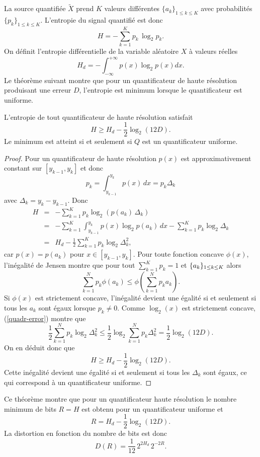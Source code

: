 La source quantifi\'ee $\tilde X$ prend $K$ valeurs diff\'erentes
$\{a_k\}_{1 \leq k \leq K}$ avec probabilit\'es
$\{p_k\}_{1 \leq k \leq K}$.
L'entropie du signal quantifi\'e est donc
\[
H = - \sum_{k=1}^K p_k\, \log_2 p_k .
\]
On d\'efinit l'entropie diff\'erentielle de la variable al\'eatoire
$X$ \`a valeurs r\'eelles
\begin{equation}
\label{entropie-dffD}
H_d = - \int_{-\infty}^{+\infty} p(x) \log_2 p(x) dx .
\end{equation}
Le th\'eor\`eme suivant montre que pour un quantificateur de haute
r\'esolution produisant une erreur $D$,
l'entropie est minimum lorsque le quantificateur est
uniforme.

\begin{theorem}
\label{quanti-theo}
L'entropie de
tout quantificateur de haute r\'esolution satisfait
\begin{equation}
\label{lower-quantX}
H \geq H_d - \frac 1 2 \log_2 (12 D) .
\end{equation}
Le minimum est atteint si et seulement si $Q$ est un
quantificateur uniforme.
\end{theorem}
\begin{proof}
Pour un quantificateur de haute r\'esolution
$p(x)$ est approximativement constant sur $[y_{k-1},y_k]$
et donc
\[
p_k = \int_{y_{k-1}}^{y_k} p(x)\,dx = p_k \Delta_k
\]
avec $\Delta_k = y_k - y_{k-1}$.
Donc
\begin{eqnarray*}
H & = & - \sum_{k=1}^K p_k \log_2 (p(a_k)\, \Delta_k )\\
& = &- \sum_{k=1}^K \int_{y_{k-1}}^{y_k} p(x) \log_2 p(a_k)\, dx
- \sum_{k=1}^K p_k \log_2 \Delta_k \\
& = & H_d - \frac 1 2 \sum_{k=1}^K p_k \log_2 \Delta_k^2 ,
\end{eqnarray*}
car $p(x) = p(a_k)$ pour $x \in [y_{k-1},y_k]$.
Pour toute fonction concave $\phi (x)$, l'in\'egalit\'e de Jensen
montre que pour tout $\sum_{k=1}^K p_k = 1$
et $\{a_k \}_{ 1 \leq k \leq K}$ alors
\begin{equation}
\label{jensen}
\sum_{k=1}^N p_k \phi ( a_k) \leq \phi(\sum_{k=1}^N  p_k a_k) .
\end{equation}
Si $\phi (x)$ est strictement concave, l'in\'egalit\'e devient une \'egalit\'e
si et seulement si tous les $a_k$ sont \'egaux lorsque
$p_k \neq 0$. Comme $\log_2(x)$ est strictement concave,
(\ref{quadr-error}) montre que
\[
 \frac 1 2 \sum_{k=1}^N p_k \log_2 \Delta_k^2 \leq
 \frac 1 2 \log_2 \sum_{k=1}^N p_k \Delta_k^2 =
 \frac 1 2 \log_2 (12 D ) .
\]
On en d\'eduit donc que
\[
H \geq H_d - \frac 1 2 \log_2 (12 D ).
\]
Cette in\'egalit\'e devient une \'egalit\'e si et seulement si tous les
$\Delta_k$ sont \'egaux, ce qui correspond \`a un quantificateur
uniforme.
\end{proof}
Ce th\'eor\`eme montre que pour un quantificateur haute r\'esolution
le nombre minimum de bits
$R = H$ est obtenu pour un quantificateur uniforme et
\begin{equation}
\label{bit-rate-uniform}
R = H_d -  \frac 1 2 \log_2 (12 D ).
\end{equation}
La distortion en fonction du nombre de bits est donc
\[
D(R) = \frac 1 {12}\, 2^{2 H_d} \,2^{-2R} .
\]
